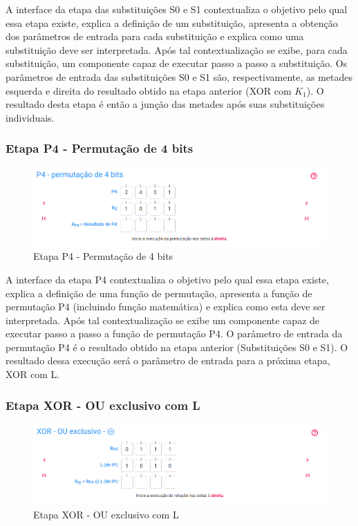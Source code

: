 A interface da etapa das substituições S0 e S1 contextualiza o objetivo pelo qual essa etapa existe, explica a definição de um substituição, apresenta a obtenção dos parâmetros de entrada para cada substituição e explica como uma substituição deve ser interpretada. Após tal contextualização se exibe, para cada substituição, um componente capaz de executar passo a passo a substituição. Os parâmetros de entrada das substituições S0 e S1 são, respectivamente, as metades esquerda e direita do resultado obtido na etapa anterior (XOR com \(K_1\)). O resultado desta etapa é então a junção das metades após suas substituições individuais.

\subsubsection{Etapa P4 - Permutação de 4 bits}

\begin{figure}[H]
    \centering
    \caption{Etapa P4 - Permutação de 4 bits}
    \includegraphics[width=1\linewidth]{UI/UIP4.png}
\end{figure}

A interface da etapa P4 contextualiza o objetivo pelo qual essa etapa existe, explica a definição de uma função de permutação, apresenta a função de permutação P4 (incluindo função matemática) e explica como esta deve ser interpretada. Após tal contextualização se exibe um componente capaz de executar passo a passo a função de permutação P4. O parâmetro de entrada da permutação P4 é o resultado obtido na etapa anterior (Substituições S0 e S1). O resultado dessa execução será o parâmetro de entrada para a próxima etapa, XOR com L.

\subsubsection{Etapa XOR - OU exclusivo com L}

\begin{figure}[H]
    \centering
    \caption{Etapa XOR - OU exclusivo com L}
    \includegraphics[width=1\linewidth]{UI/UIXORL.png}
\end{figure}

